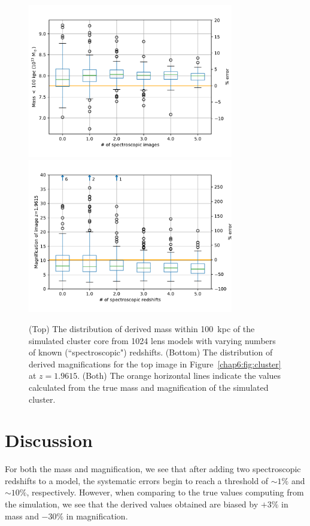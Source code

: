 \begin{figure}
\centering
\includegraphics[width=0.8\textwidth]{Chap6/mass.pdf}
\includegraphics[width=0.8\textwidth]{Chap6/mag.pdf}
\caption[Masses and magnifications of the simulated cluster derived from 1024 lens models]{(Top) The distribution of derived mass within 100~kpc of the simulated cluster core from 1024 lens models with varying numbers of known (``spectroscopic") redshifts. (Bottom) The distribution of derived magnifications for the top image in Figure~\ref{chap6:fig:cluster} at $z=1.9615$. (Both) The orange horizontal lines indicate the values calculated from the true mass and magnification of the simulated cluster.}
\label{chap6:fig:systematic_errors}
\end{figure}

\section{Discussion}

For both the mass and magnification, we see that after adding two spectroscopic redshifts to a model, the systematic errors begin to reach a threshold of $\sim1\%$ and $\sim10\%$, respectively. However, when comparing to the true values computing from the simulation, we see that the derived values obtained are biased by $+3\%$ in mass and $-30\%$ in magnification. 

